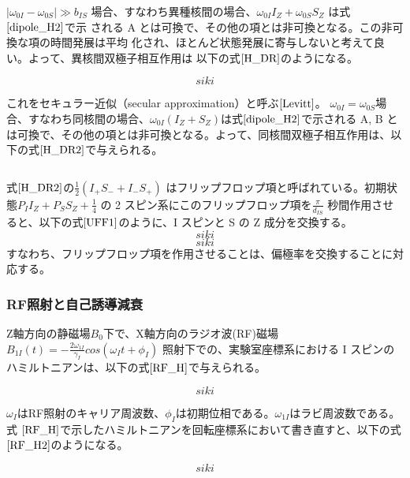 $|\omega_{0I}-\omega_{0S}|\gg b_{IS}$  場合、すなわち異種核間の場合、$\omega_{0I} I_Z + \omega_{0S}S_Z$ は式$\ref{dipole_H2}$で示
される A とは可換で、その他の項とは非可換となる。この非可換な項の時間発展は平均
化され、ほとんど状態発展に寄与しないと考えて良い。よって、異核間双極子相互作用は
以下の式$\ref{H_DR}$のようになる。

\begin{equation}
  siki
  \label{H_DR}
\end{equation}

これをセキュラー近似（secular approximation）と呼ぶ$\cite{Levitt}$。
$\omega_{0I}=\omega_{0S}$場合、すなわち同核間の場合、$ \omega_{0I}(I_Z + S_Z) $は式$\ref{dipole_H2}$で示される A, B
とは可換で、その他の項とは非可換となる。よって、同核間双極子相互作用は、以下の式$\ref{H_DR2}$で与えられる。

\begin{equation}
  \label{H_DR2}
\end{equation}

式$\ref{H_DR2}$の$\frac{1}{2}(I_+S_− + I_−S_+)$ はフリップフロップ項と呼ばれている。初期状態$P_I I_Z +P_SS_Z +\frac{1}{4}$ の 2 スピン系にこのフリップフロップ項を$ \frac{\pi}{d_{IS}}$
秒間作用させると、以下の式$\ref{UFF1}$のように、I スピンと S の Z 成分を交換する。
\begin{equation}
  siki
  \label{UFF1}
\end{equation}
\begin{equation}
  siki
  \label{UFF2}
\end{equation}
すなわち、フリップフロップ項を作用させることは、偏極率を交換することに対応する。

\subsubsection{RF照射と自己誘導減衰}
Z軸方向の静磁場$B_0$下で、X軸方向のラジオ波(RF)磁場$B_{1I}(t)= - \frac{2\omega_{1I}}{\gamma_I}cos(\omega_It+\phi_I)$
照射下での、実験室座標系における I スピンのハミルトニアンは、以下の式$\ref{RF_H}$で与えられる。

\begin{equation}
  siki
  \label{RF_H}
\end{equation}

$\omega_I$はRF照射のキャリア周波数、$\phi_I$は初期位相である。$\omega_{1I}$はラビ周波数である。式
$\ref{RF_H}$で示したハミルトニアンを回転座標系において書き直すと、以下の式$\ref{RF_H2}$のようになる。

\begin{equation}
  siki
  \label{RF_H2}
\end{equation}

